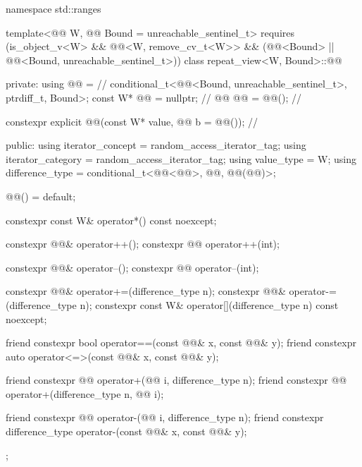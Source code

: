 \begin{codeblock}
namespace std::ranges {
  template<@@ W, @@ Bound = unreachable_sentinel_t>
    requires (is_object_v<W> && @@<W, remove_cv_t<W>> &&
              (@@<Bound> || @@<Bound, unreachable_sentinel_t>))
  class repeat_view<W, Bound>::@@ {
  private:
    using @@ =                  // \expos
      conditional_t<@@<Bound, unreachable_sentinel_t>, ptrdiff_t, Bound>;
    const W* @@ = nullptr;          // \expos
    @@ @@ = @@(); // \expos

    constexpr explicit @@(const W* value, @@ b = @@());   // \expos

  public:
    using iterator_concept = random_access_iterator_tag;
    using iterator_category = random_access_iterator_tag;
    using value_type = W;
    using difference_type = conditional_t<@@<@@>,
        @@,
        @@(@@)>;

    @@() = default;

    constexpr const W& operator*() const noexcept;

    constexpr @@& operator++();
    constexpr @@ operator++(int);

    constexpr @@& operator--();
    constexpr @@ operator--(int);

    constexpr @@& operator+=(difference_type n);
    constexpr @@& operator-=(difference_type n);
    constexpr const W& operator[](difference_type n) const noexcept;

    friend constexpr bool operator==(const @@& x, const @@& y);
    friend constexpr auto operator<=>(const @@& x, const @@& y);

    friend constexpr @@ operator+(@@ i, difference_type n);
    friend constexpr @@ operator+(difference_type n, @@ i);

    friend constexpr @@ operator-(@@ i, difference_type n);
    friend constexpr difference_type operator-(const @@& x, const @@& y);
  };
}
\end{codeblock}

